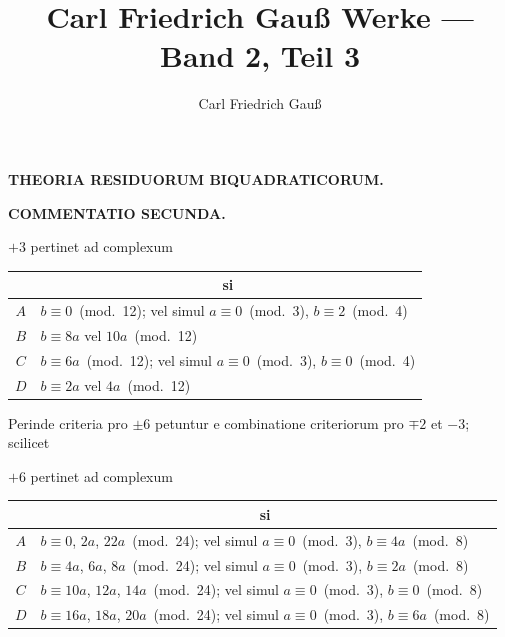 \documentclass[12pt,a4paper]{article}
\title{Carl Friedrich Gau\ss{} Werke --- Band 2, Teil 3}
\author{Carl Friedrich Gau\ss{}}
\date{}
\begin{document}
\maketitle
\thispagestyle{empty}
\setcounter{page}{101}

\begin{center}
\Large\textbf{THEORIA RESIDUORUM BIQUADRATICORUM.}
\end{center}

\begin{center}
\textbf{COMMENTATIO SECUNDA.}
\end{center}

\vspace{1em}

$+3$ pertinet ad complexum

\begin{center}
\begin{tabular}{c|l}
& \multicolumn{1}{c}{si} \\
\hline
$A$ & $b \equiv 0$~(mod.~12); vel simul $a \equiv 0$~(mod.~3), $b \equiv 2$~(mod.~4) \\
$B$ & $b \equiv 8a$ vel $10a$~(mod.~12) \\
$C$ & $b \equiv 6a$~(mod.~12); vel simul $a \equiv 0$~(mod.~3), $b \equiv 0$~(mod.~4) \\
$D$ & $b \equiv 2a$ vel $4a$~(mod.~12)
\end{tabular}
\end{center}

Perinde criteria pro $\pm 6$ petuntur e combinatione criteriorum pro $\mp 2$ et $-3$; scilicet

$+6$ pertinet ad complexum

\begin{center}
\begin{tabular}{c|l}
& \multicolumn{1}{c}{si} \\
\hline
$A$ & $b \equiv 0$, $2a$, $22a$~(mod.~24); vel simul $a \equiv 0$~(mod.~3), $b \equiv 4a$~(mod.~8) \\
$B$ & $b \equiv 4a$, $6a$, $8a$~(mod.~24); vel simul $a \equiv 0$~(mod.~3), $b \equiv 2a$~(mod.~8) \\
$C$ & $b \equiv 10a$, $12a$, $14a$~(mod.~24); vel simul $a \equiv 0$~(mod.~3), $b \equiv 0$~(mod.~8) \\
$D$ & $b \equiv 16a$, $18a$, $20a$~(mod.~24); vel simul $a \equiv 0$~(mod.~3), $b \equiv 6a$~(mod.~8)
\end{tabular}
\end{center}
\end{document}
